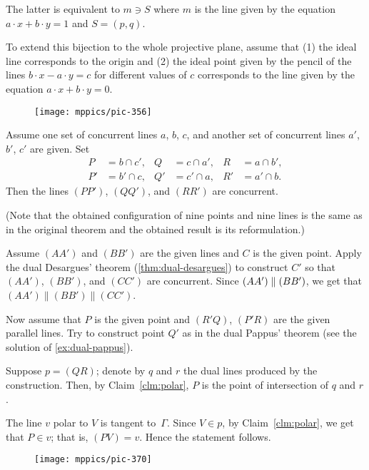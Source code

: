The latter is equivalent to $m\ni S$
where $m$ is the line given by the equation 
$a\cdot x+b\cdot y=1$ and $S=(p,q)$.

To extend this bijection to the whole projective plane, assume that 
(1) the ideal line corresponds to the origin 
and (2) the ideal point given by the pencil of the lines $b\cdot x-a\cdot y=c$ for different values of $c$ corresponds to the line given by the equation $a\cdot x+b\cdot y=0$.

\begin{wrapfigure}{r}{36mm}
\vskip-0mm
\centering
\texttt{[image: mppics/pic-356]}
\vskip-4mm
\end{wrapfigure}

Assume one set of concurrent lines $a$, $b$, $c$, 
and another set of concurrent lines $a'$, $b'$, $c'$ are given.
Set 
\begin{align*}
P&=b\cap c',
&
Q&=c\cap a',
&
R&=a\cap b',\\
P'&=b'\cap c,
&
Q'&=c'\cap a,
&
R'&=a'\cap b.
\end{align*}
Then the lines $(PP')$, $(QQ')$, and $(RR')$ are concurrent.

(Note that the obtained configuration of nine points and nine lines is the same as in the original theorem and the obtained result is its reformulation.)

Assume $(AA')$ and $(BB')$ are the given lines and $C$ is the given point.
Apply the dual Desargues' theorem (\ref{thm:dual-desargues}) to construct $C'$ so that $(AA')$, $(BB')$, and $(CC')$ are concurrent. 
Since $(AA')\z\parallel (BB')$, 
we get that 
$(AA')\parallel (BB')\parallel (CC')$.

Now assume that $P$ is the given point and $(R'Q)$, $(P'R)$ are the given parallel lines.
Try to construct point $Q'$ as in the dual Pappus' theorem (see the solution of \ref{ex:dual-pappus}).

 Suppose $p=(QR)$; denote by $q$ and $r$ the dual lines produced by the construction. Then, by Claim~\ref{clm:polar}, $P$ is the point of intersection of $q$ and $r$.

The line $v$ polar to $V$ is tangent to~$\Gamma$.
Since $V\in p$, by Claim~\ref{clm:polar}, we get that $P\in v$;
that is, $(PV)=v$.
Hence the statement follows.

\begin{wrapfigure}{r}{45mm}
\vskip-0mm
\centering
\texttt{[image: mppics/pic-370]}
\vskip-6mm
\end{wrapfigure} 

